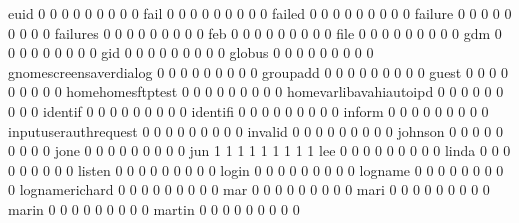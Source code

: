 \documentclass[compress,8pt]{beamer}
\begin{document}
\begin{frame}
\begin{Schunk}
  euid                                       0   0   0   0   0   0   0   0   0
  fail                                       0   0   0   0   0   0   0   0   0
  failed                                     0   0   0   0   0   0   0   0   0
  failure                                    0   0   0   0   0   0   0   0   0
  failures                                   0   0   0   0   0   0   0   0   0
  feb                                        0   0   0   0   0   0   0   0   0
  file                                       0   0   0   0   0   0   0   0   0
  gdm                                        0   0   0   0   0   0   0   0   0
  gid                                        0   0   0   0   0   0   0   0   0
  globus                                     0   0   0   0   0   0   0   0   0
  gnomescreensaverdialog                     0   0   0   0   0   0   0   0   0
  groupadd                                   0   0   0   0   0   0   0   0   0
  guest                                      0   0   0   0   0   0   0   0   0
  homehomesftptest                           0   0   0   0   0   0   0   0   0
  homevarlibavahiautoipd                     0   0   0   0   0   0   0   0   0
  identif                                    0   0   0   0   0   0   0   0   0
  identifi                                   0   0   0   0   0   0   0   0   0
  inform                                     0   0   0   0   0   0   0   0   0
  inputuserauthrequest                       0   0   0   0   0   0   0   0   0
  invalid                                    0   0   0   0   0   0   0   0   0
  johnson                                    0   0   0   0   0   0   0   0   0
  jone                                       0   0   0   0   0   0   0   0   0
  jun                                        1   1   1   1   1   1   1   1   1
  lee                                        0   0   0   0   0   0   0   0   0
  linda                                      0   0   0   0   0   0   0   0   0
  listen                                     0   0   0   0   0   0   0   0   0
  login                                      0   0   0   0   0   0   0   0   0
  logname                                    0   0   0   0   0   0   0   0   0
  lognamerichard                             0   0   0   0   0   0   0   0   0
  mar                                        0   0   0   0   0   0   0   0   0
  mari                                       0   0   0   0   0   0   0   0   0
  marin                                      0   0   0   0   0   0   0   0   0
  martin                                     0   0   0   0   0   0   0   0   0

\end{Schunk}
\end{frame}
\end{document}
